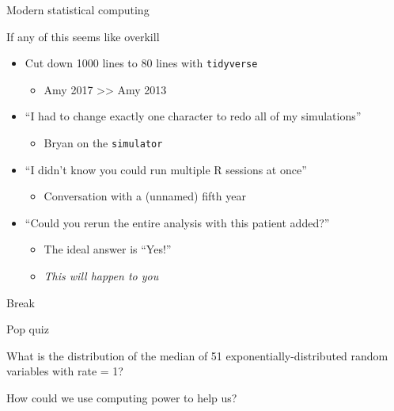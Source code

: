 \documentclass[ignorenonframetext,]{beamer}
\providecommand{\tightlist}{%
  \setlength{\itemsep}{0pt}\setlength{\parskip}{0pt}}
\begin{document}
\begin{frame}[fragile]{Modern statistical computing}
\protect\hypertarget{modern-statistical-computing}{}

If any of this seems like overkill

\begin{itemize}
\tightlist
\item
  Cut down 1000 lines to 80 lines with \texttt{tidyverse}

  \begin{itemize}
  \tightlist
  \item
    Amy 2017 \textgreater{}\textgreater{} Amy 2013
  \end{itemize}
\item
  ``I had to change exactly one character to redo all of my
  simulations''

  \begin{itemize}
  \tightlist
  \item
    Bryan on the \texttt{simulator}
  \end{itemize}
\item
  ``I didn't know you could run multiple R sessions at once''

  \begin{itemize}
  \tightlist
  \item
    Conversation with a (unnamed) fifth year
  \end{itemize}
\item
  ``Could you rerun the entire analysis with this patient added?''

  \begin{itemize}
  \tightlist
  \item
    The ideal answer is ``Yes!''
  \item
    \emph{This will happen to you}
  \end{itemize}
\end{itemize}

\end{frame}

\begin{frame}{Break}
\protect\hypertarget{break}{}

\end{frame}

\begin{frame}{Pop quiz}
\protect\hypertarget{pop-quiz}{}

What is the distribution of the median of 51 exponentially-distributed
random variables with rate = 1?

How could we use computing power to help us?

\end{frame}
\end{document}
